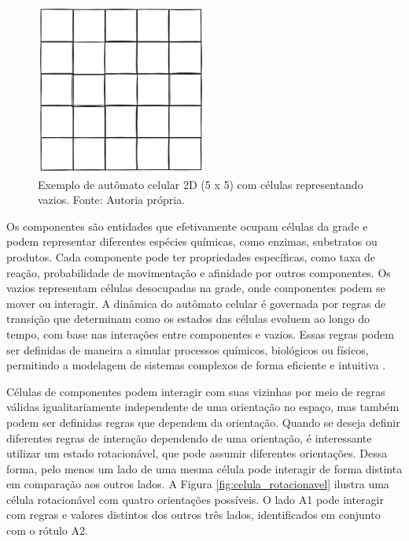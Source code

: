 \documentclass[12pt,oneside]{report}
\begin{document}
\begin{figure}[H]
    \centering
    \includegraphics[width=0.5\textwidth]{img/grade_2d.png}
    \caption{\small Exemplo de autômato celular 2D (5 x 5) com células representando vazios. Fonte: Autoria própria.}
    \label{fig:grade_2d}
\end{figure}

Os componentes são entidades que efetivamente ocupam células da grade e podem representar diferentes espécies químicas, como enzimas, substratos ou produtos. Cada componente pode ter propriedades específicas, como taxa de reação, probabilidade de movimentação e afinidade por outros componentes. Os vazios representam células desocupadas na grade, onde componentes podem se mover ou interagir. A dinâmica do autômato celular é governada por regras de transição que determinam como os estados das células evoluem ao longo do tempo, com base nas interações entre componentes e vazios. Essas regras podem ser definidas de maneira a simular processos químicos, biológicos ou físicos, permitindo a modelagem de sistemas complexos de forma eficiente e intuitiva \cite{kier2005}.

Células de componentes podem interagir com suas vizinhas por meio de regras válidas igualitariamente independente de uma orientação no espaço, mas também podem ser definidas regras que dependem da orientação. Quando se deseja definir diferentes regras de interação dependendo de uma orientação, é interessante utilizar um estado rotacionável, que pode assumir diferentes orientações. Dessa forma, pelo menos um lado de uma mesma célula pode interagir de forma distinta em comparação aos outros lados. A Figura \ref{fig:celula_rotacionavel} ilustra uma célula rotacionável com quatro orientações possíveis. O lado A1 pode interagir com regras e valores distintos dos outros três lados, identificados em conjunto com o rótulo A2.
\end{document}
